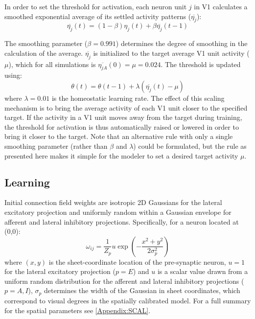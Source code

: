 In order to set the threshold for activation, each neuron unit $j$ in
V1 calculates a smoothed exponential average of its settled activity
patterns ($\overline{\eta_{j}}$):
\begin{equation}
\overline{\eta_{j}}(t)= (1-\beta)\eta_{j}(t) + \beta\overline{\eta_{j}}(t-1)
\label{eqn:averaging}
\end{equation}

The smoothing parameter ($\beta=0.991$) determines the degree of
smoothing in the calculation of the average. $\overline{\eta_{j}}$ is
initialized to the target average V1 unit activity ($\mu$), which for
all simulations is $\overline{\eta_{jA}}(0) = \mu= 0.024$. The
threshold is updated using:
\begin{equation}
\label{eqn:thresholdupdate}%
\theta(t)= \theta(t-1) + \lambda(\overline{\eta_{j}}(t) -\mu)
\end{equation}
where $\lambda=0.01$ is the homeostatic learning rate. The effect of
this scaling mechanism is to bring the average activity of each V1
unit closer to the specified target. If the activity in a V1 unit
moves away from the target during training, the threshold for
activation is thus automatically raised or lowered in order to bring
it closer to the target. Note that an alternative rule with only a
single smoothing parameter (rather than $\beta$ and $\lambda$) could
be formulated, but the rule as presented here makes it simple for the
modeler to set a desired target activity $\mu$.

\subsection*{Learning}

Initial connection field weights are isotropic 2D Gaussians for the
lateral excitatory projection and uniformly random within a Gaussian
envelope for afferent and lateral inhibitory
projections. Specifically, for a neuron located at (0,0):
\begin{equation}
\omega_{ij}=\frac{1}{Z_p}u\exp\left(-\frac{x^{2}+y^{2}}{2\sigma_{p}^{2}}\right)
\label{eqn:gaussrandomweights}
\end{equation}
where $(x, y)$ is the sheet-coordinate location of the pre-synaptic
neuron, $u=1$ for the lateral excitatory projection ($p=E$) and $u$ is
a scalar value drawn from a uniform random distribution for the
afferent and lateral inhibitory projections ($p=A,I$), $\sigma_{p}$
determines the width of the Gaussian in sheet coordinates, which
correspond to visual degrees in the spatially calibrated model. For a
full summary for the spatial parameters see \ref{Appendix:SCAL}.

